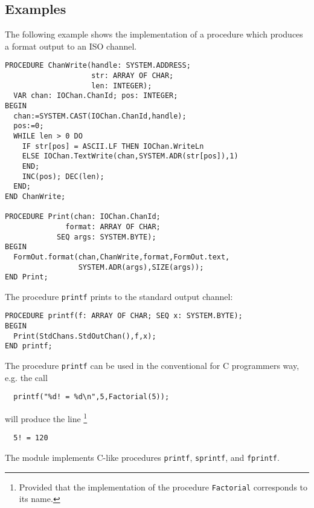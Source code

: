 \subsection{Examples}

The following example shows the implementation of a procedure which
produces a format output to an ISO channel.
\begin{verbatim}
PROCEDURE ChanWrite(handle: SYSTEM.ADDRESS;
                    str: ARRAY OF CHAR;
                    len: INTEGER);
  VAR chan: IOChan.ChanId; pos: INTEGER;
BEGIN
  chan:=SYSTEM.CAST(IOChan.ChanId,handle);
  pos:=0;
  WHILE len > 0 DO
    IF str[pos] = ASCII.LF THEN IOChan.WriteLn
    ELSE IOChan.TextWrite(chan,SYSTEM.ADR(str[pos]),1)
    END;
    INC(pos); DEC(len);
  END;
END ChanWrite;

PROCEDURE Print(chan: IOChan.ChanId;
              format: ARRAY OF CHAR;
            SEQ args: SYSTEM.BYTE);
BEGIN
  FormOut.format(chan,ChanWrite,format,FormOut.text,
                 SYSTEM.ADR(args),SIZE(args));
END Print;
\end{verbatim}

\noindent
The procedure {\tt printf} prints to the standard output channel:
\begin{verbatim}
PROCEDURE printf(f: ARRAY OF CHAR; SEQ x: SYSTEM.BYTE);
BEGIN
  Print(StdChans.StdOutChan(),f,x);
END printf;
\end{verbatim}

The  procedure  {\tt  printf}  can  be used in the
conventional for C programmers way, e.g. the call
\begin{verbatim}
  printf("%d! = %d\n",5,Factorial(5));
\end{verbatim}
will produce the line
\footnote{Provided that the implementation of the procedure {\tt Factorial}
corresponds to its name.}
\begin{verbatim}
  5! = 120
\end{verbatim}

The  module implements C-like procedures {\tt printf},
{\tt sprintf}, and {\tt fprintf}.


